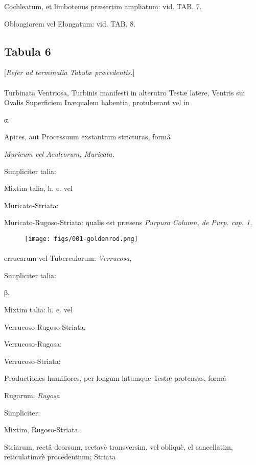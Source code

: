 \documentclass[a4paper, 11pt, oneside, polutonikogreek, german]{article}
\begin{document}
Cochleatum, et limbotenus præsertim ampliatum: vid. TAB. 7.

Oblongiorem vel Elongatum: vid. TAB. 8.
\clearpage
\subsection{Tabula 6}
\begin{center}
[\emph{Refer ad terminalia Tabulæ præcedentis.}]
\end{center}
\paragraph{}
Turbinata Ventriosa, Turbinis manifesti in alterutro Testæ latere, Ventris sui Ovalis Superficiem Inæqualem habentia, protuberant vel in

α.

Apices, aut Processuum exstantium stricturas, formâ

\emph{Muricum vel Aculeorum, Muricata,}

Simpliciter talia:

Mixtim talia, h. e. vel

Muricato-Striata:

Muricato-Rugoso-Striata: qualis est præsens \emph{Purpura Column, de Purp. cap. 1.}

\begin{figure}[H]
\centering
\texttt{[image: figs/001-goldenrod.png]}
\end{figure}
\paragraph{}
errucarum vel Tuberculorum: \emph{Verrucosa},

Simpliciter talia:

β.

Mixtim talia: h. e. vel

Verrucoso-Rugoso-Striata.

Verrucoso-Rugosa:

Verrucoso-Striata:

Productiones humiliores, per longum latumque Testæ protensas, formâ

Rugarum: \emph{Rugosa}

Simpliciter:

Mixtim, Rugoso-Striata.

Striarum, rectâ deorsum, rectavè transversim, vel obliquè, el cancellatim, reticulatimvè procedentium; Striata
\end{document}

